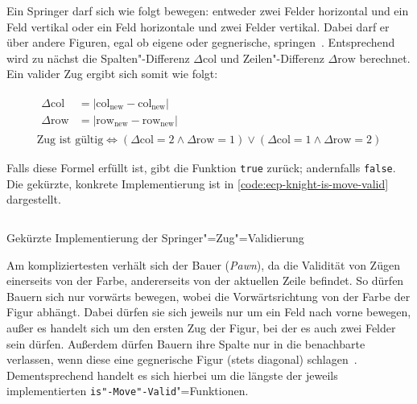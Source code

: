 
Ein Springer darf sich wie folgt bewegen: entweder zwei Felder horizontal und ein Feld vertikal oder ein Feld horizontale und zwei Felder vertikal. Dabei darf er über andere Figuren, egal ob eigene oder gegnerische, springen~\cite{justUSChessFederations2019}. Entsprechend wird zu nächst die Spalten"-Differenz $\Delta\text{col}$ und Zeilen"-Differenz $\Delta\text{row}$ berechnet. Ein valider Zug ergibt sich somit wie folgt:

\vspace{-1em}
\begin{gather*}
    \begin{aligned}
        \Delta\text{col} &= \vert \text{col}_{\text{new}} - \text{col}_{\text{new}} \vert \\
        \Delta\text{row} &= \vert \text{row}_{\text{new}} - \text{row}_{\text{new}} \vert
    \end{aligned}
    \\
    \text{Zug ist gültig} \iff (\Delta\text{col} = 2 \land \Delta\text{row} = 1) \lor (\Delta\text{col} = 1 \land \Delta\text{row} = 2)
\end{gather*}

Falls diese Formel erfüllt ist, gibt die Funktion \texttt{true} zurück; andernfalls \texttt{false}. Die gekürzte, konkrete Implementierung ist in \autoref{code:ecp-knight-is-move-valid} dargestellt.

\begin{listing}[h]
    \inputminted{cpp}{../assets/code/ECPKnight-isMoveValid.cpp}
    \caption{Gekürzte Implementierung der Springer"=Zug"=Validierung}
    \label{code:ecp-knight-is-move-valid}
\end{listing}


Am kompliziertesten verhält sich der Bauer (\emph{Pawn}), da die Validität von Zügen einerseits von der Farbe, andererseits von der aktuellen Zeile befindet. So dürfen Bauern sich nur vorwärts bewegen, wobei die Vorwärtsrichtung von der Farbe der Figur abhängt. Dabei dürfen sie sich jeweils nur um ein Feld nach vorne bewegen, außer es handelt sich um den ersten Zug der Figur, bei der es auch zwei Felder sein dürfen. Außerdem dürfen Bauern ihre Spalte nur in die benachbarte verlassen, wenn diese eine gegnerische Figur (stets diagonal) schlagen~\cite{justUSChessFederations2019}. Dementsprechend handelt es sich hierbei um die längste der jeweils implementierten \texttt{is"-Move"-Valid}"=Funktionen.

